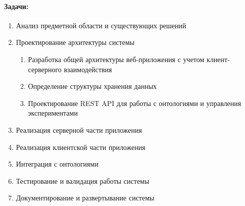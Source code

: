 \paragraph*{Задачи:}
\begin{enumerate}
    \item Анализ предметной области и существующих решений
    \item Проектирование архитектуры системы
    \begin{enumerate}[label=\arabic{enumi}.\arabic*.]
        \item Разработка общей архитектуры веб-приложения с учетом клиент-серверного взаимодействия
        \item Определение структуры хранения данных
        \item Проектирование REST API для работы с онтологиями и управления экспериментами
    \end{enumerate}
    \item Реализация серверной части приложения
    \item Реализация клиентской части приложения
    \item Интеграция с онтологиями
    \item Тестирование и валидация работы системы
    \item Документирование и развертывание системы
\end{enumerate}